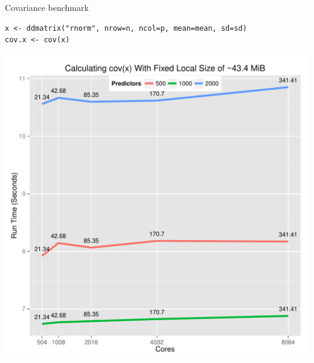 \begin{frame}[fragile]
  \begin{block}{Covariance benchmark}
    \vspace{-3ex}\scriptsize
    \begin{lstlisting}
x <- ddmatrix("rnorm", nrow=n, ncol=p, mean=mean, sd=sd)
cov.x <- cov(x)
    \end{lstlisting}
    \vspace{-4ex}
    \begin{center}
      \includegraphics[trim=3mm 1mm 2mm 11.5mm,clip,height=.78\textheight]{../common/pics/cov}
    \end{center}
  \end{block}
\end{frame}

